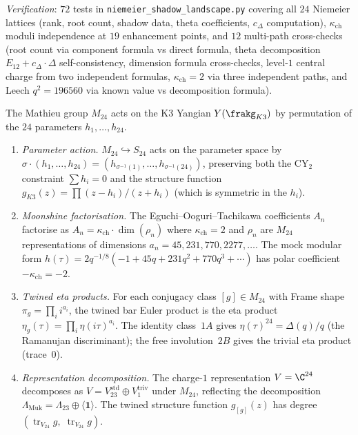 \noindent\textit{Verification}: $72$ tests in
\texttt{niemeier\_shadow\_landscape.py} covering all $24$
Niemeier lattices (rank, root count, shadow data, theta
coefficients, $c_\Delta$ computation), $\kappa_{\mathrm{ch}}$ moduli
independence at $19$ enhancement points, and $12$ multi-path
cross-checks (root count via component formula vs direct formula,
theta decomposition $E_{12} + c_\Delta \cdot \Delta$ self-consistency,
dimension formula cross-checks, level-$1$ central charge from two
independent formulas, $\kappa_{\mathrm{ch}} = 2$ via three independent
paths, and Leech $q^2 = 196560$ via known value vs decomposition
formula).

\begin{conjecture}
\label{conj:mathieu-moonshine-yangian}
\ClaimStatusConjectured
The Mathieu group $M_{24}$ acts on the K3 Yangian $Y(\frakg_{K3})$ by
permutation of the $24$ parameters $h_1, \ldots, h_{24}$.
\begin{enumerate}[label=\textup{(\alph*)}]
  \item \emph{Parameter action.}
  $M_{24} \hookrightarrow S_{24}$ acts on the parameter space by
  $\sigma \cdot (h_1, \ldots, h_{24}) = (h_{\sigma^{-1}(1)}, \ldots,
  h_{\sigma^{-1}(24)})$, preserving both the CY$_2$ constraint
  $\sum h_i = 0$ and the structure function
  $g_{K3}(z) = \prod (z - h_i)/(z + h_i)$ (which is symmetric in the $h_i$).

  \item \emph{Moonshine factorisation.}
  The Eguchi--Ooguri--Tachikawa coefficients $A_n$ factorise as
  $A_n = \kappa_{\mathrm{ch}} \cdot \dim(\rho_n)$ where
  $\kappa_{\mathrm{ch}} = 2$ and $\rho_n$ are $M_{24}$ representations
  of dimensions $a_n = 45, 231, 770, 2277, \ldots$.
  The mock modular form
  $h(\tau) = 2 q^{-1/8}(-1 + 45q + 231q^2 + 770q^3 + \cdots)$
  has polar coefficient $-\kappa_{\mathrm{ch}} = -2$.

  \item \emph{Twined eta products.}
  For each conjugacy class $[g] \in M_{24}$ with Frame shape
  $\pi_g = \prod_i i^{a_i}$, the twined bar Euler product is the eta
  product $\eta_g(\tau) = \prod_{i} \eta(i\tau)^{a_i}$.
  The identity class~$1A$ gives $\eta(\tau)^{24} = \Delta(q)/q$
  (the Ramanujan discriminant); the free involution~$2B$ gives
  the trivial eta product (trace~$0$).

  \item \emph{Representation decomposition.}
  The charge-$1$ representation $V = \C^{24}$ decomposes as
  $V = V_{23}^{\mathrm{std}} \oplus V_1^{\mathrm{triv}}$
  under $M_{24}$, reflecting the decomposition
  $\Lambda_{\mathrm{Muk}} = \Lambda_{23} \oplus \langle\mathbf{1}\rangle$.
  The twined structure function $g_{[g]}(z)$ has
  degree $(\operatorname{tr}_{V_{24}} g,\; \operatorname{tr}_{V_{24}} g)$.
\end{enumerate}


\end{conjecture}
